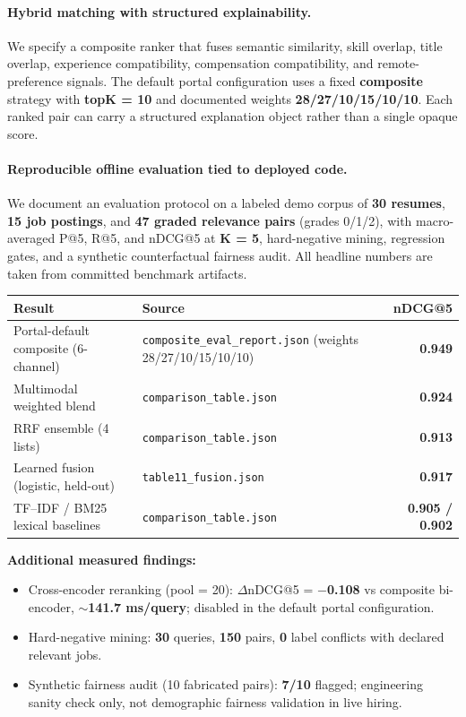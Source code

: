 \documentclass[11pt,a4paper]{article}
\begin{document}
\paragraph{Hybrid matching with structured explainability.}
We specify a composite ranker that fuses semantic similarity, skill overlap, title overlap, experience compatibility, compensation compatibility, and remote-preference signals. The default portal configuration uses a fixed \textbf{composite} strategy with \textbf{topK = 10} and documented weights \textbf{28/27/10/15/10/10}. Each ranked pair can carry a structured explanation object rather than a single opaque score.

\paragraph{Reproducible offline evaluation tied to deployed code.}
We document an evaluation protocol on a labeled demo corpus of \textbf{30 resumes}, \textbf{15 job postings}, and \textbf{47 graded relevance pairs} (grades 0/1/2), with macro-averaged P@5, R@5, and nDCG@5 at \textbf{K = 5}, hard-negative mining, regression gates, and a synthetic counterfactual fairness audit. All headline numbers are taken from committed benchmark artifacts.

\begin{center}
\small
\begin{tabular}{@{}llr@{}}
\toprule
Result & Source & nDCG@5 \\
\midrule
Portal-default composite (6-channel) & \texttt{composite\_eval\_report.json} (weights 28/27/10/15/10/10) & \textbf{0.949} \\
Multimodal weighted blend & \texttt{comparison\_table.json} & \textbf{0.924} \\
RRF ensemble (4 lists) & \texttt{comparison\_table.json} & \textbf{0.913} \\
Learned fusion (logistic, held-out) & \texttt{table11\_fusion.json} & \textbf{0.917} \\
TF--IDF / BM25 lexical baselines & \texttt{comparison\_table.json} & \textbf{0.905 / 0.902} \\
\bottomrule
\end{tabular}
\end{center}

\noindent\textbf{Additional measured findings:}
\begin{itemize}[noitemsep]
  \item Cross-encoder reranking (pool = 20): $\Delta$nDCG@5 = \textbf{$-$0.108} vs composite bi-encoder, \textbf{$\sim$141.7 ms/query}; disabled in the default portal configuration.
  \item Hard-negative mining: \textbf{30} queries, \textbf{150} pairs, \textbf{0} label conflicts with declared relevant jobs.
  \item Synthetic fairness audit (10 fabricated pairs): \textbf{7/10} flagged; engineering sanity check only, not demographic fairness validation in live hiring.
\end{itemize}
\end{document}
